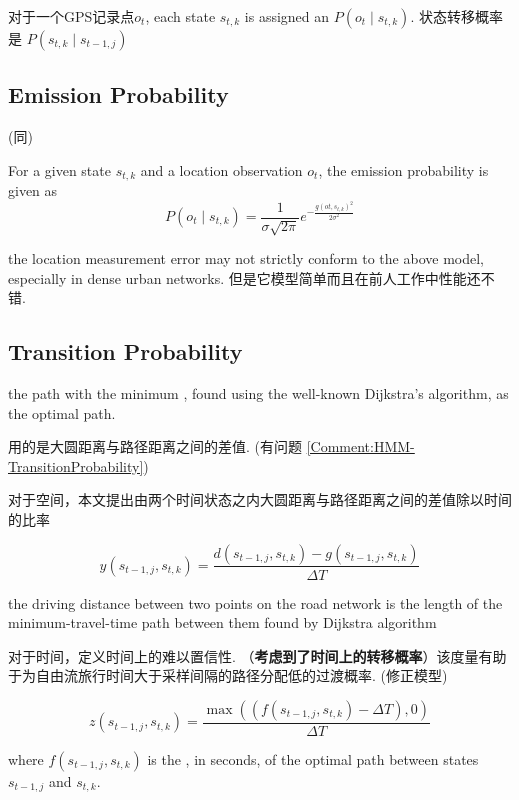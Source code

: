 对于一个GPS记录点$ o_{t} $, each state $ s_{t, k} $ is assigned an  $ P\left(o_{t} \mid s_{t, k}\right) $.  状态转移概率是 $ P\left(s_{t, k} \mid s_{t-1, j}\right) $

\subsection{Emission Probability}

(同\cite{newson2009hidden})

For a given state $ s_{t, k} $ and a location observation $ o_{t} $, the emission probability is given as
$$
P\left(o_{t} \mid s_{t, k}\right)=\frac{1}{\sigma \sqrt{2 \pi}} e^{-\frac{g\left(o t, s_{t, k}\right)^{2}}{2 \sigma^{2}}}
$$

\begin{remark}
    the location measurement error may not strictly conform to the above model, especially in dense urban networks. 但是它模型简单而且在前人工作中性能还不错. 
\end{remark}

\subsection{Transition Probability}

the path with the minimum , found using
the well-known Dijkstra’s algorithm, as the optimal path.

\cite{newson2009hidden}用的是大圆距离与路径距离之间的差值. (有问题 \ref{Comment:HMM-TransitionProbability})

对于空间，本文提出由两个时间状态之内大圆距离与路径距离之间的差值除以时间的比率

$$ y\left(s_{t-1, j}, s_{t, k}\right)=\frac{d\left(s_{t-1, j}, s_{t, k}\right)-g\left(s_{t-1, j}, s_{t, k}\right)}{\Delta T} $$

the driving distance
between two points on the road network is the length of the
minimum-travel-time path between them found by Dijkstra
algorithm

对于时间，定义时间上的难以置信性. （\textbf{考虑到了时间上的转移概率}）该度量有助于为自由流旅行时间大于采样间隔的路径分配低的过渡概率. (修正模型)

$$
z\left(s_{t-1, j}, s_{t, k}\right)=\frac{\max \left(\left(f\left(s_{t-1, j}, s_{t, k}\right)-\Delta T\right), 0\right)}{\Delta T}
$$

where $ f\left(s_{t-1, j}, s_{t, k}\right) $ is the , in seconds, of the optimal path between states $ s_{t-1, j} $ and $ s_{t, k} $.

